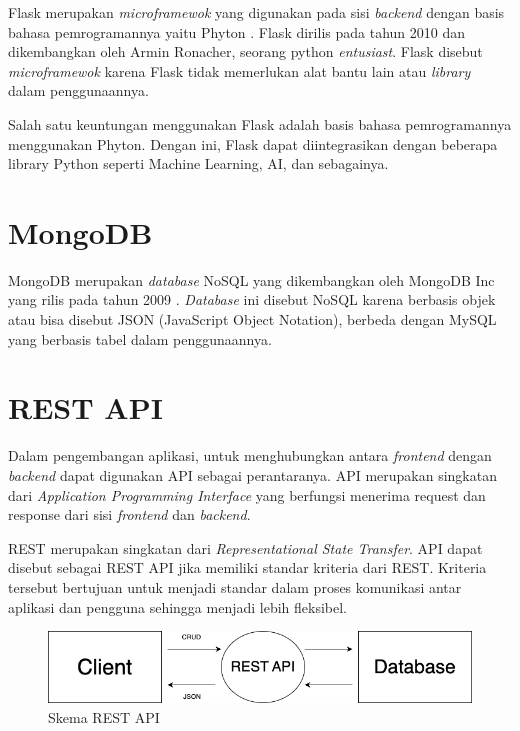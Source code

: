 Flask merupakan \textit{microframewok} yang digunakan pada sisi \textit{backend} dengan basis bahasa pemrogramannya yaitu Phyton \citep{flaskweb}. Flask dirilis pada tahun 2010 dan dikembangkan oleh Armin Ronacher, seorang python \textit{entusiast}. Flask disebut \textit{microframewok} karena Flask tidak memerlukan alat bantu lain atau \textit{library} dalam penggunaannya.

Salah satu keuntungan menggunakan Flask adalah basis bahasa pemrogramannya menggunakan Phyton. Dengan ini, Flask dapat diintegrasikan dengan beberapa library Python seperti Machine Learning, AI, dan sebagainya.

\section{MongoDB}

MongoDB merupakan \textit{database} NoSQL yang dikembangkan oleh MongoDB Inc yang rilis pada tahun 2009 \citep{mongodbweb}. \textit{Database} ini disebut NoSQL karena berbasis objek atau bisa disebut JSON (JavaScript Object Notation), berbeda dengan MySQL yang berbasis tabel dalam penggunaannya.

\section{REST API}

Dalam pengembangan aplikasi, untuk menghubungkan antara \textit{frontend} dengan \textit{backend} dapat digunakan API sebagai perantaranya. API merupakan singkatan dari \textit{Application Programming Interface} yang berfungsi menerima request dan response dari sisi \textit{frontend} dan \textit{backend}.

REST merupakan singkatan dari \textit{Representational State Transfer}. API dapat disebut sebagai REST API jika memiliki standar kriteria dari REST. Kriteria tersebut bertujuan untuk menjadi standar dalam proses komunikasi antar aplikasi dan pengguna sehingga menjadi lebih fleksibel.

\begin{figure}[H]
	\centering
	\includegraphics[width=1\textwidth]{gambar/restapi.png}
	\caption{Skema REST API}
\end{figure}

